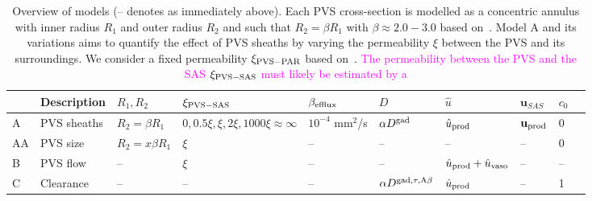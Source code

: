 \documentclass[fleqn,10pt]{wlscirep}
\newcommand{\mer}[1]{\textcolor{magenta}{#1}}
\begin{document}
\begin{table}
  \begin{center}
  \begin{tabular}{ll|llllll|ll}
    \toprule
    & Description & $R_1, R_2$ & $\xi_{\rm PVS-SAS}$ &  $\beta_{\rm efflux}$ & $D$ & $\hat{u}$ & $\mathbf{u}_{SAS}$ & $c_0$ \\
    \midrule
    A & PVS sheaths & $R_2 = \beta R_1$ & $0, 0.5 \xi, \xi, 2 \xi, 1000 \xi \approx \infty$ & $10^{-4}$ mm$^2$/s\cite{hornkjol2022csf} & $\alpha D^{\rm gad}$\cite{sykova2008diffusion, valnes2020apparent} & $\hat{u}_{\rm prod}$ & $\mathbf{u}_{\rm prod}$ & 0 \\ 
    AA & PVS size & $R_2 = x \beta R_1$ & $\xi$ & -- & -- & -- &  -- & 0 \\ 
    B & PVS flow & -- & $\xi$ & -- & --  & $\hat{u}_{\rm prod} + \hat{u}_{\rm vaso}$  & -- & --  \\
    C & Clearance & -- & -- & -- & $\alpha D^{\rm gad, \tau, A\beta}$  & $\hat{u}_{\rm prod}$ & -- & 1 \\
    \bottomrule
    \end{tabular}
    \end{center}
  \caption{Overview of models (-- denotes as immediately above). Each
    PVS cross-section is modelled as a concentric annulus with inner
    radius $R_1$ and outer radius $R_2$ and such that $R_2 = \beta
    R_1$ with $\beta \approx 2.0-3.0$ based on~\cite{bedussi2018paravascular, mestre2018flow, raicevic2023sizes}. Model A and its variations aims to
    quantify the effect of PVS sheaths by varying the permeability
    $\xi$ between the PVS and its surroundings. We consider a fixed
    permeability $\xi_{\rm PVS-PAR}$ based
    on~\cite{koch2023estimates}. \mer{The permeability between the PVS
      and the SAS $\xi_{\rm PVS-SAS}$ must likely be estimated by a
}}
\end{table}
\end{document}
